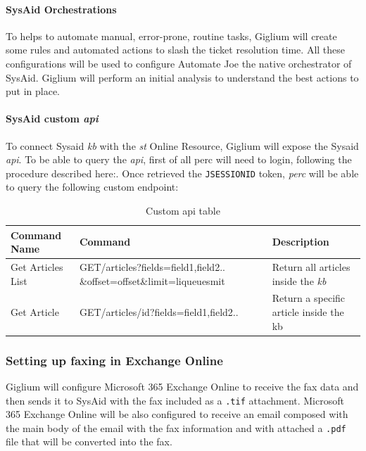 \paragraph{SysAid Orchestrations} To helps to automate manual, error-prone, routine tasks, Giglium will create some rules and automated actions to slash the ticket resolution time. All these configurations will be used to configure Automate Joe the native orchestrator of SysAid. Giglium will perform an initial analysis to understand the best actions to put in place. 

\paragraph{SysAid custom \textit{\gls{api}}} To connect Sysaid \textit{\gls{kb}} with the \textit{\gls{st}} Online Resource\cite{propanesafety}, Giglium will expose the Sysaid \textit{\gls{api}}. To be able to query the \textit{\gls{api}}, first of all \gls{perc} will need to login, following the procedure described here:\cite{sysaid_api_login}. Once retrieved the \texttt{JSESSIONID} token, \textit{\gls{perc}} will be able to query the following custom endpoint:

\begin{table}[h!]
	\begin{center}
		\begin{tabularx}{\linewidth}{l|X|X|}
			\toprule
			\textbf{Command Name} & \textbf{Command} & \textbf{Description}\\
			\midrule 
			Get Articles List & GET/articles?fields={field1,field2..} 
			\&offset={offset}\&limit={liqueuesmit} &  Return all articles inside the \textit{\gls{kb}}\\[10ex]
			Get Article       & GET/articles/{id}?fields={field1,field2..} & Return a specific article inside the \gls{kb}\\
			
			\bottomrule
		\end{tabularx}
		\caption{Custom \gls{api} table}\label{tab:api}
	\end{center}
\end{table}

\subsubsection{Setting up faxing in Exchange Online}\label{fax_setup}
Giglium will configure Microsoft 365 Exchange Online to receive the fax data and then sends it to SysAid with the fax included as a \texttt{.tif} attachment. Microsoft 365 Exchange Online will be also configured to receive an email composed with the main body of the email with the fax information and with attached a \texttt{.pdf} file that will be converted into the fax.

